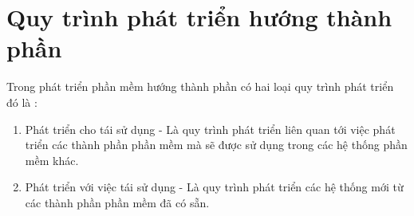 \section{Quy trình phát triển hướng thành phần}
Trong phát triển phần mềm hướng thành phần có hai loại quy trình phát triển đó là :
\begin{enumerate}
\item Phát triển cho tái sử dụng - Là quy trình phát triển liên quan tới việc phát triển các thành phần phần mềm mà sẽ được sử dụng trong các hệ thống phần mềm khác.
\item Phát triển với việc tái sử dụng - Là quy trình phát triển các hệ thống mới từ các thành phần phần mềm đã có sẵn.
\end{enumerate}




